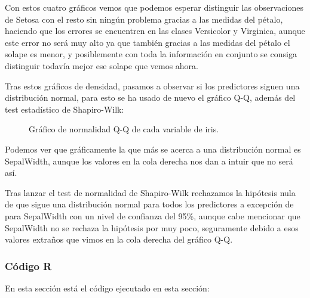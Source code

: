 Con estos cuatro gráficos vemos que podemos esperar distinguir las observaciones de Setosa con el resto sin ningún problema gracias a las medidas del pétalo, haciendo que los errores se encuentren en las clases Versicolor y Virginica, aunque este error no será muy alto ya que también gracias a las medidas del pétalo el solape es menor, y posiblemente con toda la información en conjunto se consiga distinguir todavía mejor ese solape que vemos ahora.


Tras estos gráficos de densidad, pasamos a observar si los predictores siguen una distribución normal, para esto se ha usado de nuevo el gráfico Q-Q, además del test estadístico de Shapiro-Wilk:

\begin{figure}[H]
	\centering
	
	\caption{Gráfico de normalidad Q-Q de cada variable de iris.}
	\label{fig:qqplot_iris}
\end{figure}


Podemos ver que gráficamente la que más se acerca a una distribución normal es SepalWidth, aunque los valores en la cola derecha nos dan a intuir que no será así.

Tras lanzar el test de normalidad de Shapiro-Wilk rechazamos la hipótesis nula de que sigue una distribución normal para todos los predictores a excepción de para SepalWidth con un nivel de confianza del 95\%, aunque cabe mencionar que SepalWidth no se rechaza la hipótesis por muy poco, seguramente debido a esos valores extraños que vimos en la cola derecha del gráfico Q-Q.


\subsubsection{Código R}

En esta sección está el código ejecutado en esta sección:

